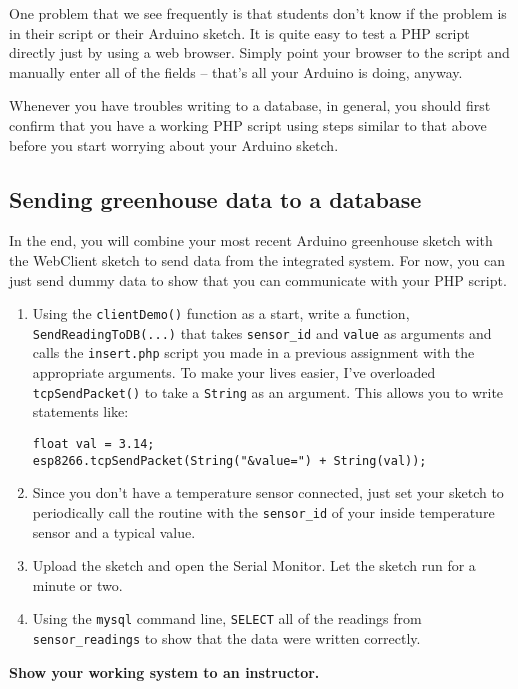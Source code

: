 \documentclass[11pt]{article} %
\begin{document}
One problem that we see frequently is that students don’t know if the problem is in their script or their Arduino sketch. It is quite easy to test a PHP script directly just by using a web browser. Simply point your browser to the script and manually enter all of the fields -- that’s all your Arduino is doing, anyway.

Whenever you have troubles writing to a database, in general, you should first confirm that you have a working PHP script using steps similar to that above before you start worrying about your Arduino sketch.

\subsection*{Sending greenhouse data to a database}

In the end, you will combine your most recent Arduino greenhouse sketch with the WebClient sketch to send data from the integrated system. For now, you can just send dummy data to show that you can communicate with your PHP script.

\begin{enumerate}
\item Using the \verb|clientDemo()| function as a start, write a function, \verb|SendReadingToDB(...)| that takes \verb|sensor_id| and \verb|value| as arguments and calls the \verb|insert.php| script you made in a previous assignment with the appropriate arguments. To make your lives easier, I’ve overloaded \verb|tcpSendPacket()| to take a \verb|String| as an argument. This allows you to write statements like:

\begin{verbatim}
float val = 3.14;
esp8266.tcpSendPacket(String("&value=") + String(val));
\end{verbatim}

\item Since you don’t have a temperature sensor connected, just set your sketch to periodically call the routine with the \verb|sensor_id| of your inside temperature sensor and a typical value.
\item Upload the sketch and open the Serial Monitor. Let the sketch run for a minute or two.
\item Using the \verb|mysql| command line, \verb|SELECT| all of the readings from \verb|sensor_readings| to show that the data were written correctly.
\end{enumerate}

{\bf Show your working system to an instructor.}
\end{document}
